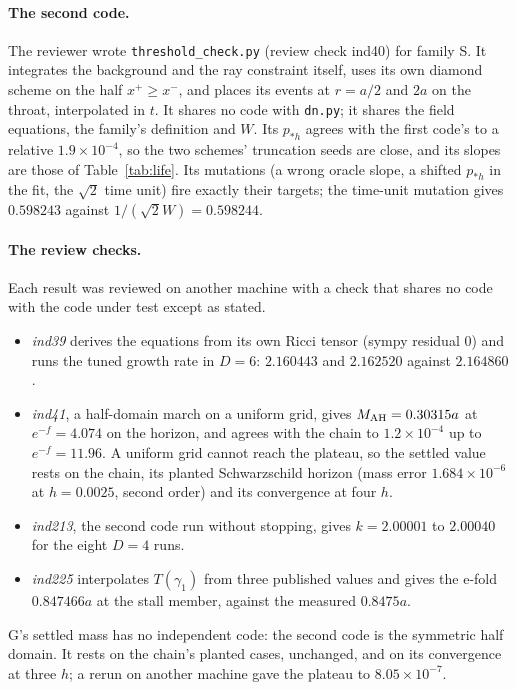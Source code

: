 \documentclass[11pt]{article}
\newcommand{\pst}{p_{*h}}
\newcommand{\AH}{{\rm AH}}
\begin{document}
\paragraph{The second code.} The reviewer wrote \texttt{threshold\_check.py} (review check ind40) for family S. It integrates the
background and the ray constraint itself, uses its own diamond scheme on the half $x^+\ge x^-$, and places its events at
$r=a/2$ and $2a$ on the throat, interpolated in $t$. It shares no code with \texttt{dn.py}; it shares the field
equations, the family's definition and $W$. Its $\pst$ agrees with the first code's to a relative $1.9\times10^{-4}$, so
the two schemes' truncation seeds are close, and its slopes are those of Table~\ref{tab:life}. Its mutations (a wrong
oracle slope, a shifted $\pst$ in the fit, the $\sqrt2$ time unit) fire exactly their targets; the time-unit mutation
gives $0.598243$ against $1/(\sqrt2W)=0.598244$.

\paragraph{The review checks.} Each result was reviewed on another machine with a check that shares no code with the
code under test except as stated.
\begin{itemize}
\item \emph{ind39} derives the equations from its own Ricci tensor (sympy residual 0) and runs the tuned growth rate in
$D=6$: $2.160443$ and $2.162520$ against $2.164860$.
\item \emph{ind41}, a half-domain march on a uniform grid, gives $M_\AH=0.30315a$ at $e^{-f}=4.074$ on the horizon, and
agrees with the chain to $1.2\times10^{-4}$ up to $e^{-f}=11.96$. A uniform grid cannot reach the plateau, so the
settled value rests on the chain, its planted Schwarzschild horizon (mass error $1.684\times10^{-6}$ at $h=0.0025$,
second order) and its convergence at four $h$.
\item \emph{ind213}, the second code run without stopping, gives $k=2.00001$ to $2.00040$ for the eight $D=4$ runs.
\item \emph{ind225} interpolates $T(\gamma_1)$ from three published values and gives the e-fold $0.847466a$ at the
stall member, against the measured $0.8475a$.
\end{itemize}
G's settled mass has no independent code: the second code is the symmetric half domain. It rests on the chain's
planted cases, unchanged, and on its convergence at three $h$; a rerun on another machine gave the plateau to
$8.05\times10^{-7}$.
\end{document}

